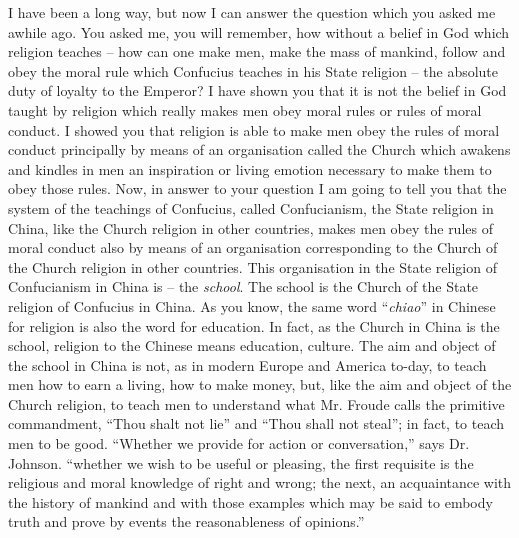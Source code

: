 I have been a long way, but now I can answer the question which you asked me awhile ago.
You asked me, you will remember, how without a belief in God which religion teaches
-- how can one make men, make the mass of mankind, follow and obey the moral rule which Confucius teaches in his State religion
-- the absolute duty of loyalty to the Emperor?
I have shown you that it is not the belief in God taught by religion which really makes men obey moral rules or rules of moral conduct.
I showed you that religion is able to make men obey the rules of moral conduct principally by means of an organisation called the Church which awakens and kindles in men an inspiration or living emotion necessary to make them to obey those rules.
Now, in answer to your question I am going to tell you that the system of the teachings of Confucius, called Confucianism,
the State religion in China, like the Church religion in other countries, makes men obey the rules of moral conduct also by means of an organisation corresponding to the Church of the Church religion in other countries. This organisation in the State religion of Confucianism in China is -- the \emph{school}. The school is the Church of the State religion of Confucius in China.
As you know, the same word ``\emph{chiao}'' in Chinese for religion is also the word for education. In fact, as the Church in China is the school, religion to the Chinese means education, culture.
The aim and object of the school in China is not, as in modern Europe and America to-day, to teach men how to earn a living, how to make money, but, like the aim and object of the Church religion, to teach men to understand what Mr. Froude calls the primitive commandment, ``Thou shalt not lie'' and ``Thou shall not steal'';
in fact, to teach men to be good.
``Whether we provide for action or conversation,'' says Dr. Johnson. ``whether we wish to be useful or pleasing, the first requisite is the religious and moral knowledge of right and wrong; the next, an acquaintance with the history of mankind and with those examples which may be said to embody truth and prove by events the reasonableness of opinions.''

